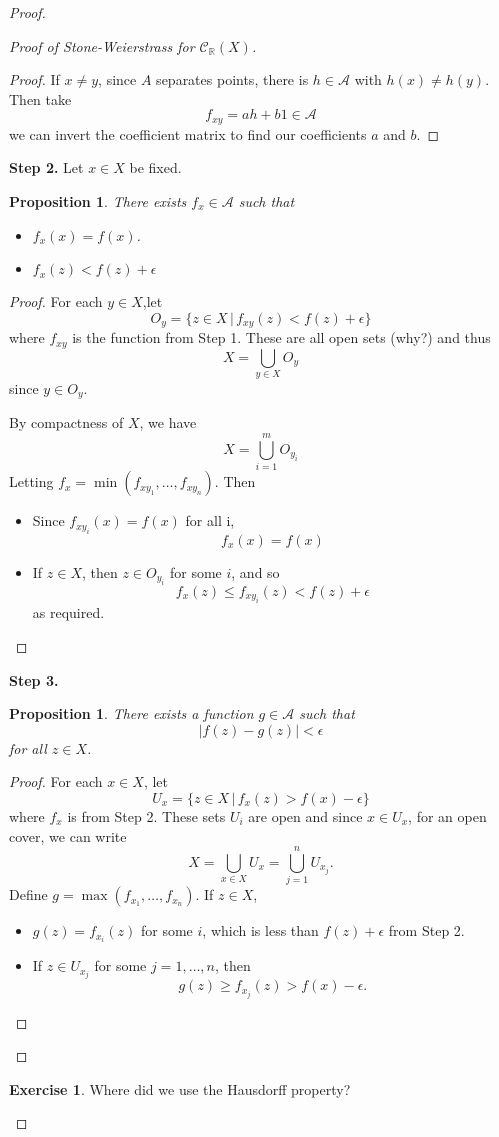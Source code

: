 \documentclass[10pt, oneside, reqno]{amsart}
\theoremstyle{plain}%
\newtheorem{prop}[thm]{Proposition}
\theoremstyle{definition}
\newtheorem{exer}[thm]{Exercise}
\theoremstyle{remark}
\newcommand{\R}{\mathbb{R}}
\begin{document}
\begin{proof}
\begin{proof}[Proof of Stone-Weierstrass for $\mathcal{C}_\R(X)$]
\begin{proof}
			If $x \neq y$, since $A$ separates points, there is $h \in \mathcal{A}$ with $h(x) \neq h(y)$.  Then take \[
				f_{xy} = a h + b 1 \in \mathcal{A}
			\] we can invert the coefficient matrix to find our coefficients $a$ and $b$.  
		\end{proof}
		
		\textbf{Step 2.} Let $x \in X$ be fixed.  
		\begin{prop}
			There exists $f_x \in \mathcal{A}$ such that \begin{itemize}
				\item $f_x(x) = f(x)$.  
				\item $f_x(z) < f(z) + \epsilon$
			\end{itemize}
		\end{prop}
		\begin{proof}
			For each $y \in X$,let \[
				O_y = \{ z \in X \, | \, f_{xy}(z) < f(z) + \epsilon \}
			\] where $f_{xy}$ is the function from Step 1.  These are all open sets (why?) and thus \[
				X = \bigcup_{y \in X} O_y
			\] since $y \in O_y$.  
			
			By compactness of $X$, we have \[
				X = \bigcup_{i=1}^m O_{y_i}
			\]  Letting $f_x = \min(f_{xy_1}, \dots, f_{xy_n})$.  Then 
			\begin{itemize}
				\item Since $f_{xy_i}(x) = f(x)$ for all i, \[
					f_x(x) = f(x)
				\]
				\item If $z \in X$, then $z \in O_{y_i}$ for some $i$, and so \[
					f_x(z) \leq f_{x y_i}(z) < f(z) + \epsilon
				\] as required.
			\end{itemize} 
		\end{proof}
		
		\textbf{Step 3.}  \begin{prop}
			There exists a function $g \in \mathcal{A}$ such that \[
				|f(z) - g(z) | < \epsilon
			\] for all $z \in X$.  
		\end{prop}
		\begin{proof}
			For each $x \in X$, let \[
				U_x = \{ z \in X \, | \, f_x(z) > f(x) - \epsilon \} 
			\] where $f_x$ is from Step 2.  These sets $U_i$ are open and since $x \in U_x$, for an open cover, we can write \[
				X = \bigcup_{x \in X} U_x = \bigcup_{j=1}^n U_{x_j}.
			\]  
			Define $g = \max(f_{x_1}, \dots, f_{x_n})$.  If $z \in X$, 
			\begin{itemize}
				\item $g(z) = f_{x_i}(z)$ for some $i$, which is less than $f(z) + \epsilon$ from Step 2.
				\item If $z \in U_{x_j}$ for some $j = 1, \dots, n$, then \[
					g(z) \geq f_{x_j}(z) > f(x) - \epsilon.  
				\]
			\end{itemize}
		\end{proof} 
	\end{proof}
	\begin{exer}
		Where did we use the Hausdorff property?
	\end{exer}
	

\end{proof}
\end{document}
